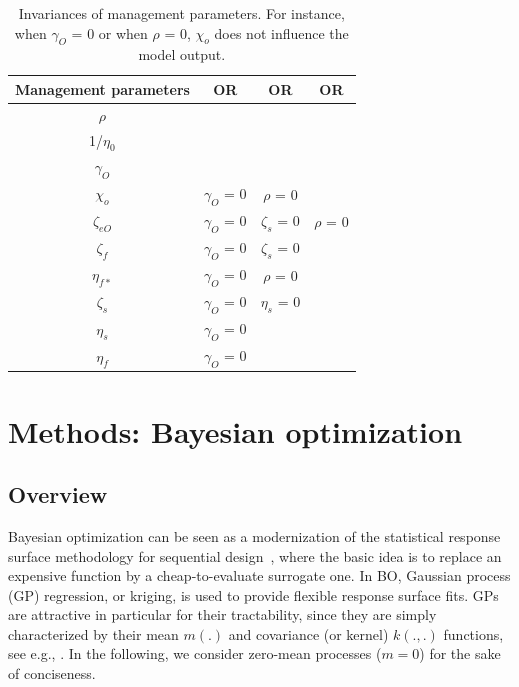 	\begin{table}[htbp]
		\centering
		\caption{Invariances of management parameters. For instance, when  $\gamma_{O}$ = 0 or when $\rho$ = 0, $\chi_{o}$ does not influence the model output. }
		\begin{tabular}{|c|c|c|c|}
			\midrule
			\textbf{Management parameters} & \textbf{OR} & \textbf{OR} & \textbf{OR} \\
			\midrule
			$\rho$ & & & \\
			\midrule
			1/$\eta_{0}$ & & & \\
			\midrule
			$\gamma_{O}$ & & & \\
			\midrule
			$\chi_{o}$ & $\gamma_{O}$ = 0 & $\rho$ = 0 & \\
			\midrule
			$\zeta_{eO}$ & $\gamma_{O}$ = 0 & $\zeta_{s}$ = 0 & $\rho$ = 0\\
			\midrule
			$\zeta_{f}$ & $\gamma_{O}$ = 0 & $\zeta_{s}$ = 0 & \\
			\midrule
			$\eta_{f*}$ & $\gamma_{O}$ = 0 & $\rho$ = 0 & \\
			\midrule
			$\zeta_{s}$ & $\gamma_{O}$ = 0 & $\eta_{s}$ = 0 & \\
			\midrule
			$\eta_{s}$ & $\gamma_{O}$ = 0 & & \\
			\midrule
			$\eta_{f}$ & $\gamma_{O}$ = 0 & & \\
			\midrule
			
		\end{tabular}%
		\label{tab:table_invariances_parameters}%
	\end{table}%
	
	
	\section{Methods: Bayesian optimization}\label{sec:bo}
	
	\subsection{Overview}
	Bayesian optimization can be seen as a modernization of the statistical response surface
	methodology for sequential design~\cite{box1987empirical}, where the basic idea is to replace an expensive function by a cheap-to-evaluate surrogate one.
	In BO, Gaussian process (GP) regression, or kriging, is used to provide flexible response surface fits.
	GPs are attractive in particular for their tractability, 
	since they are simply characterized by their mean $m(.)$ and covariance (or kernel) $k(.,.)$ functions, see e.g., \citet{Rasmussen2006}. 
	In the following, we consider zero-mean processes ($m = 0$) for the sake of conciseness.
	
